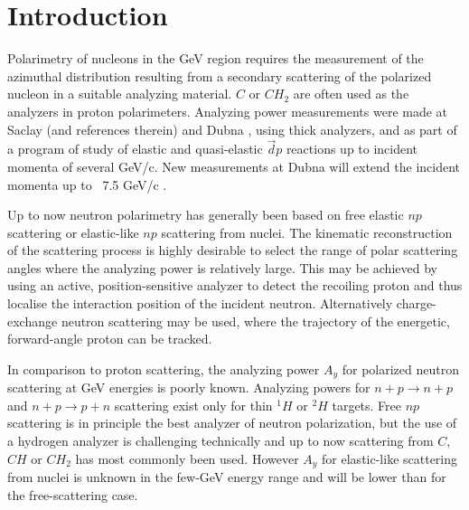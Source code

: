 \documentclass[epj]{svjour}
\begin{document}
\maketitle
%
\section{Introduction}
\label{intro}


Polarimetry of nucleons in the GeV region requires the measurement of the azimuthal distribution resulting from a secondary scattering of the polarized nucleon in a suitable  analyzing material. $C$ or $CH_2$ are often used as the analyzers in proton polarimeters. Analyzing power measurements were made at Saclay \cite{Cheung:1995ei} (and references therein)  and Dubna \cite{Azhgirey:2004yk}, using thick analyzers, and as part of a program of study of elastic and quasi-elastic  $\vec d p$ reactions \cite{Lehar:2001wq} up to incident momenta of several GeV/c. New measurements at Dubna will extend the incident momenta up to ~7.5 GeV/c \cite{ALPOM2}.


Up to now neutron polarimetry has generally been based on free elastic $np$ scattering
or elastic-like $np$ scattering from nuclei. The kinematic reconstruction of the scattering process is highly desirable to select the range of polar scattering angles where the analyzing power is relatively large. This may be achieved by using an active, position-sensitive analyzer to detect the recoiling proton and thus localise the interaction position of the incident neutron. Alternatively charge-exchange neutron scattering may be used, where the trajectory of the energetic, forward-angle proton can be tracked. 

In comparison to proton scattering, the analyzing power $A_{y}$ for
polarized neutron scattering at GeV energies is poorly known. Analyzing powers for $n+p\to n+p$ and $n+p\to p+n$ scattering exist only for thin $^1H$ or $^2H$ targets.
Free $np$ scattering is in principle the best analyzer of neutron polarization,
but the use of a hydrogen analyzer is challenging technically and
up to now scattering from $C$, $CH$ or $CH_2$ 
has most commonly been used. However $A_{y}$ for elastic-like scattering
from nuclei is unknown in the few-GeV energy range and will be lower than for the free-scattering case. 
\end{document}
